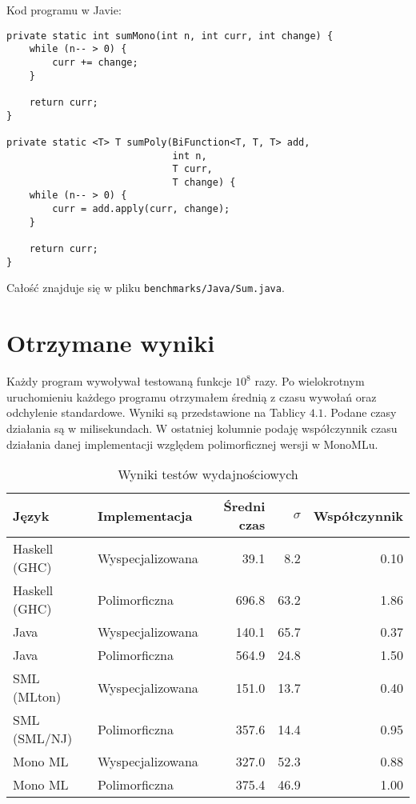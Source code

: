 \documentclass[declaration,shortabstract]{iithesis}
\begin{document}
Kod programu w Javie: 
\begin{lstlisting}[frame=lines]
private static int sumMono(int n, int curr, int change) {
    while (n-- > 0) {
        curr += change;
    }

    return curr;
}

private static <T> T sumPoly(BiFunction<T, T, T> add, 
                             int n, 
                             T curr, 
                             T change) {
    while (n-- > 0) {
        curr = add.apply(curr, change);
    }

    return curr;
}
\end{lstlisting}
Całość znajduje się w pliku \texttt{benchmarks/Java/Sum.java}.



\section{Otrzymane wyniki}

Każdy program wywoływał testowaną funkcje $10^8$ razy.
Po wielokrotnym uruchomieniu każdego programu otrzymałem średnią z czasu wywołań
oraz odchylenie standardowe. Wyniki są przedstawione na Tablicy $4.1$.
Podane czasy działania są w milisekundach.
W ostatniej kolumnie podaję współczynnik czasu działania danej implementacji 
względem polimorficznej wersji w MonoMLu.
\pagebreak

\begin{table}
\caption{Wyniki testów wydajnościowych}
\begin{tabular}{|| l | l | r | r | r ||} 

 \hline
 Język & Implementacja & Średni czas & $\sigma$ & Współczynnik \\ 
 \hline\hline
 Haskell (GHC)        & Wyspecjalizowana & 39.1  & 8.2  & 0.10 \\ 
 Haskell (GHC)        & Polimorficzna    & 696.8 & 63.2 & 1.86 \\ 
 Java                 & Wyspecjalizowana & 140.1 & 65.7 & 0.37 \\ 
 Java                 & Polimorficzna    & 564.9 & 24.8 & 1.50 \\ 
 SML (MLton)  & Wyspecjalizowana & 151.0 & 13.7 & 0.40 \\ 
 SML (SML/NJ) & Polimorficzna    & 357.6 & 14.4 & 0.95 \\ 
 Mono ML              & Wyspecjalizowana & 327.0 & 52.3 & 0.88 \\ 
 Mono ML              & Polimorficzna    & 375.4 & 46.9 & 1.00 \\ 
 \hline
\end{tabular}
\end{table}
\end{document}

